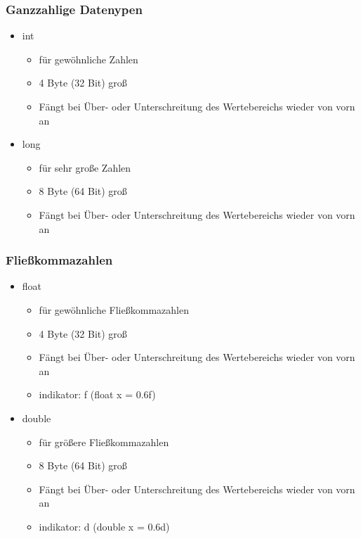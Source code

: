 \begin{frame}[fragile]
	\frametitle{Ganzzahlige Datenypen}
			\begin{itemize}
			  \item int
			  \begin{itemize}
			    \item für gewöhnliche Zahlen
			  	\item 4 Byte (32 Bit) groß
			  	\item Fängt bei Über- oder Unterschreitung des Wertebereichs wieder von
			  	vorn an
			  \end{itemize}
			  \item long
			  \begin{itemize}
			    \item für sehr große Zahlen
			  	\item 8 Byte (64 Bit) groß
			  	\item Fängt bei Über- oder Unterschreitung des Wertebereichs wieder von
			  	vorn an
			  \end{itemize}
			\end{itemize}
\end{frame}

\begin{frame}[fragile]
	\frametitle{Fließkommazahlen}
			\begin{itemize}
			  \item float
			  \begin{itemize}
			    \item für gewöhnliche Fließkommazahlen
			  	\item 4 Byte (32 Bit) groß
			  	\item Fängt bei Über- oder Unterschreitung des Wertebereichs wieder von
			  	vorn an
			  	\item indikator: f (float x = 0.6f)
			  \end{itemize}
			  \item double
			  \begin{itemize}
			    \item für größere Fließkommazahlen
			  	\item 8 Byte (64 Bit) groß
			  	\item Fängt bei Über- oder Unterschreitung des Wertebereichs wieder von
			  	vorn an
			  	\item indikator: d (double x = 0.6d)
			  \end{itemize}
			\end{itemize}
\end{frame}

